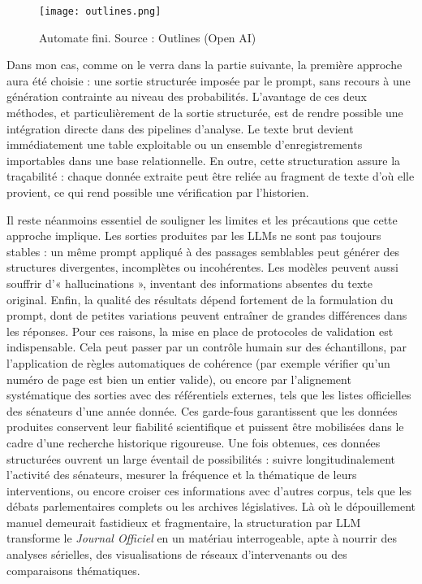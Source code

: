 \begin{figure}[htbp]
\centering
\texttt{[image: outlines.png]}
\caption{Automate fini. Source : Outlines (Open AI)}
\label{fig:outlines}
\end{figure}

Dans mon cas, comme on le verra dans la partie suivante, la première approche aura été choisie : une sortie structurée imposée par le prompt, sans recours à une génération contrainte au niveau des probabilités. L’avantage de ces deux méthodes, et particulièrement de la sortie structurée, est de rendre possible une intégration directe dans des pipelines d’analyse. Le texte brut devient immédiatement une table exploitable ou un ensemble d’enregistrements importables dans une base relationnelle. En outre, cette structuration assure la traçabilité : chaque donnée extraite peut être reliée au fragment de texte d’où elle provient, ce qui rend possible une vérification par l’historien.

Il reste néanmoins essentiel de souligner les limites et les précautions que cette approche implique. Les sorties produites par les LLMs ne sont pas toujours stables : un même prompt appliqué à des passages semblables peut générer des structures divergentes, incomplètes ou incohérentes. Les modèles peuvent aussi souffrir d’« hallucinations », inventant des informations absentes du texte original. Enfin, la qualité des résultats dépend fortement de la formulation du prompt, dont de petites variations peuvent entraîner de grandes différences dans les réponses. Pour ces raisons, la mise en place de protocoles de validation est indispensable. Cela peut passer par un contrôle humain sur des échantillons, par l’application de règles automatiques de cohérence (par exemple vérifier qu’un numéro de page est bien un entier valide), ou encore par l’alignement systématique des sorties avec des référentiels externes, tels que les listes officielles des sénateurs d’une année donnée. Ces garde-fous garantissent que les données produites conservent leur fiabilité scientifique et puissent être mobilisées dans le cadre d’une recherche historique rigoureuse. Une fois obtenues, ces données structurées ouvrent un large éventail de possibilités : suivre longitudinalement l’activité des sénateurs, mesurer la fréquence et la thématique de leurs interventions, ou encore croiser ces informations avec d’autres corpus, tels que les débats parlementaires complets ou les archives législatives. Là où le dépouillement manuel demeurait fastidieux et fragmentaire, la structuration par LLM transforme le \emph{Journal Officiel} en un matériau interrogeable, apte à nourrir des analyses sérielles, des visualisations de réseaux d’intervenants ou des comparaisons thématiques.

